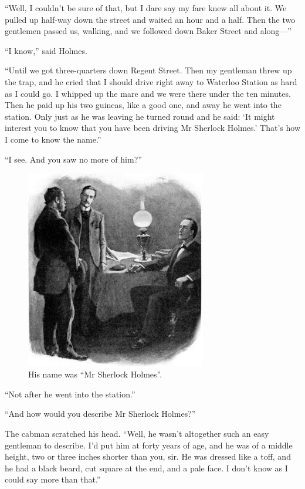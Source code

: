 \documentclass[paper=5.5in:8.5in,BCOR=7mm,twoside,DIV=calc,12pt,usegeometry,openany,chapterprefix,endperiod,headings=big]{scrbook} %
\begin{document}
\enquote{Well, I couldn't be sure of that, but I dare say my fare knew all about it. We pulled up half-way down the street and waited an hour and a half. Then the two gentlemen passed us, walking, and we followed down Baker Street and along---}

\enquote{I know,} said Holmes.

\enquote{Until we got three-quarters down Regent Street. Then my gentleman threw up the trap, and he cried that I should drive right away to Waterloo Station as hard as I could go. I whipped up the mare and we were there under the ten minutes. Then he paid up his two guineas, like a good one, and away he went into the station. Only just as he was leaving he turned round and he said: \enquote{It might interest you to know that you have been driving Mr Sherlock Holmes.} That's how I come to know the name.}

\enquote{I see. And you saw no more of him?}

\begin{figure}[tbhp]
\centering
\includegraphics[width=0.7\textwidth]{05_cabman}
\caption{His name was \enquote{Mr Sherlock Holmes}.}
\end{figure}

\afterpage{\clearpage}


\enquote{Not after he went into the station.}

\enquote{And how would you describe Mr Sherlock Holmes?}

The cabman scratched his head. \enquote{Well, he wasn't altogether such an easy gentleman to describe. I'd put him at forty years of age, and he was of a middle height, two or three inches shorter than you, sir. He was dressed like a toff, and he had a black beard, cut square at the end, and a pale face. I don't know as I could say more than that.}
\end{document}
